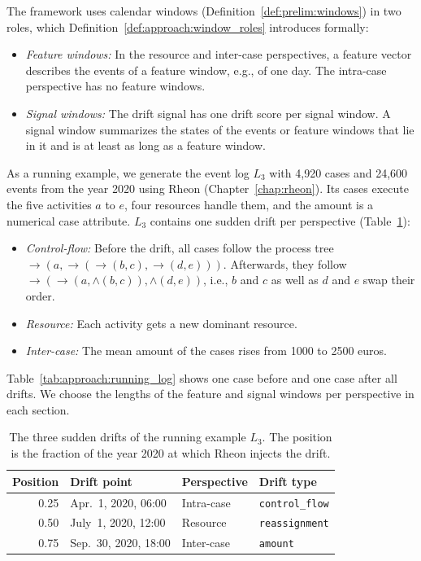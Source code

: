 The framework uses calendar windows (Definition~\ref{def:prelim:windows}) in two roles, which Definition~\ref{def:approach:window_roles} introduces formally:
\begin{itemize}
	\item \emph{Feature windows:} In the resource and inter-case perspectives, a feature vector describes the events of a feature window, e.g., of one day. The intra-case perspective has no feature windows.
	\item \emph{Signal windows:} The drift signal has one drift score per signal window. A signal window summarizes the states of the events or feature windows that lie in it and is at least as long as a feature window.
\end{itemize}

As a running example, we generate the event log $L_3$ with 4,920 cases and 24,600 events from the year 2020 using Rheon (Chapter~\ref{chap:rheon}). Its cases execute the five activities $a$ to $e$, four resources handle them, and the amount is a numerical case attribute. $L_3$ contains one sudden drift per perspective (Table~\ref{tab:approach:running_drifts}):
\begin{itemize}
	\item \emph{Control-flow:} Before the drift, all cases follow the process tree ${\rightarrow}(a,\allowbreak {\rightarrow}({\rightarrow}(b, c),\allowbreak {\rightarrow}(d, e)))$. Afterwards, they follow ${\rightarrow}({\rightarrow}(a,\allowbreak {\wedge}(b, c)),\allowbreak {\wedge}(d, e))$, i.e., $b$ and $c$ as well as $d$ and $e$ swap their order.
	\item \emph{Resource:} Each activity gets a new dominant resource.
	\item \emph{Inter-case:} The mean amount of the cases rises from 1000 to 2500 euros.
\end{itemize}
Table~\ref{tab:approach:running_log} shows one case before and one case after all drifts. We choose the lengths of the feature and signal windows per perspective in each section.

\begin{table}[tb]
	\centering
	\caption[Drifts of the running example]{%
		The three sudden drifts of the running example $L_3$. The position is the fraction of the year 2020 at which Rheon injects the drift.}
	\label{tab:approach:running_drifts}
	\small
	\begin{tabular}{@{}rlll@{}}
		\toprule
		Position & Drift point          & Perspective & Drift type             \\
		\midrule
		0.25     & Apr.~1, 2020, 06:00  & Intra-case  & \texttt{control\_flow} \\
		0.50     & July~1, 2020, 12:00  & Resource    & \texttt{reassignment}  \\
		0.75     & Sep.~30, 2020, 18:00 & Inter-case  & \texttt{amount}        \\
		\bottomrule
	\end{tabular}
\end{table}

